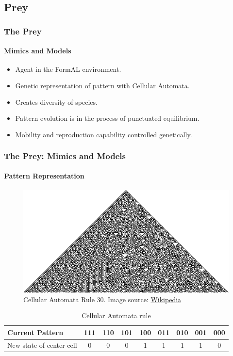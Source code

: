 \subsection{Prey}

\frame
{
	\frametitle{The Prey}
	\framesubtitle{Mimics and Models}
	
	\begin{itemize}
		\item Agent in the FormAL environment.
		\item Genetic representation of pattern with Cellular Automata.
		\item Creates diversity of species.
		\item Pattern evolution is in the process of punctuated equilibrium.
		\item Mobility and reproduction capability controlled genetically.
	\end{itemize}
}

\frame
{
	\frametitle{The Prey: Mimics and Models}
	\framesubtitle{Pattern Representation}

	\begin{figure}[H]
		\centering
		\includegraphics[scale=3]{../tex/images/CA_rule30s}
		\caption{Cellular Automata Rule 30.
		Image source: \href{http://en.wikipedia.org/wiki/Cellular_automata}{Wikipedia}}
		\label{fig:cellular-automata-rule-30}
	\end{figure}
	
	\begin{table}
		\centering
		\begin{scriptsize}
		\begin{tabular}{| p{2cm} | c | c | c | c | c | c | c | c |}
		  \hline
		  Current Pattern & 111 & 110 & 101 & 100 & 011 & 010 & 001 & 000 \\ \hline
		  New state of center cell & 0 & 0 & 0 & 1 & 1 & 1 & 1 & 0 \\
		  \hline
		\end{tabular}
		\end{scriptsize}		
		\caption{Cellular Automata rule}
		\label{tab:cellular-automata-rule}
	\end{table}
}

